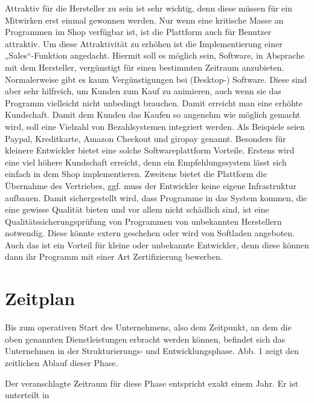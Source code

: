 Attraktiv für die Hersteller zu sein ist sehr wichtig, denn diese müssen für ein Mitwirken erst einmal gewonnen werden. 
Nur wenn eine kritische Masse an Programmen im Shop verfügbar ist, ist die Plattform auch für Benutzer attraktiv. Um diese Attraktivität zu erhöhen ist die Implementierung einer „Sales“-Funktion angedacht. Hiermit soll es möglich sein, Software, in Absprache mit dem Hersteller, vergünstigt für einen bestimmten Zeitraum anzubieten. Normalerweise gibt es kaum Vergünstigungen bei (Desktop-) Software. Diese sind aber sehr hilfreich, um Kunden zum Kauf zu animieren, auch wenn sie das Programm vielleicht nicht unbedingt brauchen. Damit erreicht man eine erhöhte Kundschaft. Damit dem Kunden das Kaufen so angenehm wie möglich gemacht wird, soll eine Vielzahl von Bezahlsystemen integriert werden. Als Beispiele seien Paypal, Kreditkarte, Amazon Checkout und giropay genannt.
Besonders für kleinere Entwickler bietet eine solche Softwareplattform Vorteile. Erstens wird eine viel höhere Kundschaft erreicht, denn ein Empfehlungssystem lässt sich einfach in dem Shop implementieren. Zweitens bietet die Plattform die Übernahme des Vertriebes, ggf. muss der Entwickler keine eigene Infrastruktur aufbauen. Damit sichergestellt wird, dass Programme in das System kommen, die eine gewisse Qualität bieten und vor allem nicht schädlich sind, ist eine Qualitätssicherungsprüfung von Programmen von unbekannten Herstellern notwendig. Diese könnte extern geschehen oder wird von Softladen angeboten. Auch das ist ein Vorteil für kleine oder unbekannte Entwickler, denn diese können dann ihr Programm mit einer Art Zertifizierung bewerben.
				
\section{Zeitplan}

Bis zum operativen Start des Unternehmens, also dem Zeitpunkt, an dem die oben genannten Dienstleistungen erbracht werden können, befindet sich das Unternehmen in der Strukturierungs- und Entwicklungsphase. Abb. 1 zeigt den zeitlichen Ablauf dieser  Phase.


Der veranschlagte Zeitraum für diese Phase entspricht exakt einem Jahr. Er ist unterteilt in


